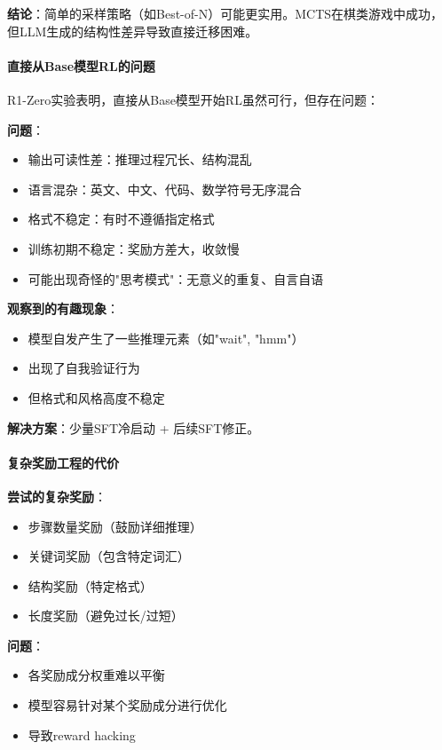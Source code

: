 \documentclass[12pt,a4paper]{article}
\begin{document}
\textbf{结论}：简单的采样策略（如Best-of-N）可能更实用。MCTS在棋类游戏中成功，但LLM生成的结构性差异导致直接迁移困难。

\paragraph{直接从Base模型RL的问题}

R1-Zero实验表明，直接从Base模型开始RL虽然可行，但存在问题：

\textbf{问题}：
\begin{itemize}
    \item 输出可读性差：推理过程冗长、结构混乱
    \item 语言混杂：英文、中文、代码、数学符号无序混合
    \item 格式不稳定：有时不遵循指定格式
    \item 训练初期不稳定：奖励方差大，收敛慢
    \item 可能出现奇怪的"思考模式"：无意义的重复、自言自语
\end{itemize}

\textbf{观察到的有趣现象}：
\begin{itemize}
    \item 模型自发产生了一些推理元素（如"wait", "hmm"）
    \item 出现了自我验证行为
    \item 但格式和风格高度不稳定
\end{itemize}

\textbf{解决方案}：少量SFT冷启动 + 后续SFT修正。

\paragraph{复杂奖励工程的代价}

\textbf{尝试的复杂奖励}：
\begin{itemize}
    \item 步骤数量奖励（鼓励详细推理）
    \item 关键词奖励（包含特定词汇）
    \item 结构奖励（特定格式）
    \item 长度奖励（避免过长/过短）
\end{itemize}

\textbf{问题}：
\begin{itemize}
    \item 各奖励成分权重难以平衡
    \item 模型容易针对某个奖励成分进行优化
    \item 导致reward hacking
\end{itemize}
\end{document}
